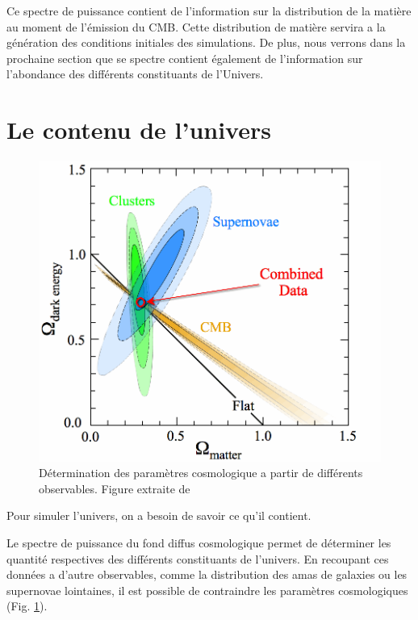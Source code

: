 Ce spectre de puissance contient de l'information sur la distribution de la matière au moment de l'émission du CMB.
Cette distribution de matière servira a la génération des conditions initiales des simulations. %
De plus, nous verrons dans la prochaine section que se spectre contient également de l'information sur l'abondance des différents constituants de l'Univers.


\section{Le contenu de l'univers}
\label{cosmoparam}

\begin{figure}[bth]
        \includegraphics[width=.95\linewidth]{img/01/cosmoparam.png} 
        \caption{Détermination des paramètres cosmologique a partir de différents observables. Figure extraite de \cite{2008ApJ...686..749K}}
 		\label{fig:cosmoparam}
\end{figure}



Pour simuler l'univers, on a besoin de savoir ce qu'il contient.


Le spectre de puissance du fond diffus cosmologique permet de déterminer les quantité respectives des différents constituants de l'univers.
En recoupant ces données a d'autre observables, comme la distribution des amas de galaxies ou les supernovae lointaines, il est possible de contraindre les paramètres cosmologiques (Fig. \ref{fig:cosmoparam}).

